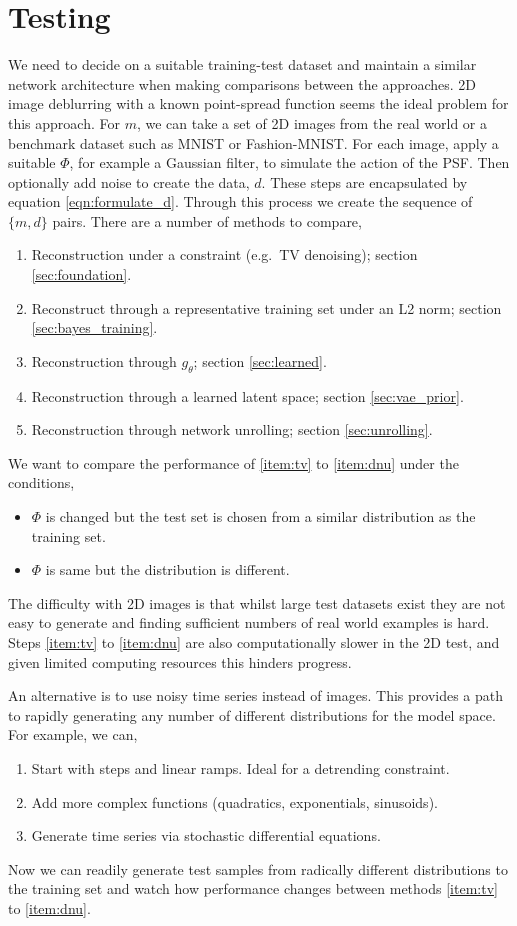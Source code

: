 \documentclass[12pt]{article}
\begin{document}
\section{Testing} 
We need to decide on a suitable training-test dataset and maintain a similar network architecture when making comparisons between the approaches.
2D image deblurring with a known point-spread function seems the ideal problem for this approach. For $m$, we can take a set of 2D images from the real world or a benchmark dataset such as MNIST or Fashion-MNIST. For each image, apply a suitable $\Phi$, for example a Gaussian filter, to simulate the action of the PSF. Then optionally add noise to create the data, $d$. These steps are encapsulated by equation \ref{eqn:formulate_d}. Through this process we create the sequence of $\{m,d\}$ pairs. There are a number of methods to compare,
\begin{enumerate}
\item \label{item:tv} Reconstruction under a constraint (e.g.\ TV denoising); section \ref{sec:foundation}.
\item Reconstruct through a representative training set under an L2 norm; section \ref{sec:bayes_training}.
\item Reconstruction through $g_{\theta}$; section \ref{sec:learned}.
\item Reconstruction through a learned latent space; section \ref{sec:vae_prior}.
\item \label{item:dnu} Reconstruction through network unrolling; section \ref{sec:unrolling}.
\end{enumerate}
We want to compare the performance of \ref{item:tv} to \ref{item:dnu} under the conditions,
\begin{itemize}
\item $\Phi$ is changed but the test set is chosen from a similar distribution as the training set.
\item $\Phi$ is same but the distribution is different.
\end{itemize}
The difficulty with 2D images is that whilst large test datasets exist they are not easy to generate and finding sufficient numbers of real world examples is hard. Steps \ref{item:tv} to \ref{item:dnu}  are also computationally slower in the 2D test, and given limited computing resources this hinders progress.

An alternative is to use noisy time series instead of images. This provides a path to rapidly generating any number of different distributions for the model space. For example, we can,
\begin{enumerate}
\item Start with steps and linear ramps. Ideal for a detrending constraint. 
\item Add more complex functions (quadratics, exponentials, sinusoids).
\item Generate time series via stochastic differential equations.
\end{enumerate}
Now we can readily generate test samples from radically different distributions to the training set and watch how performance changes between methods \ref{item:tv} to \ref{item:dnu}. 
\end{document}
